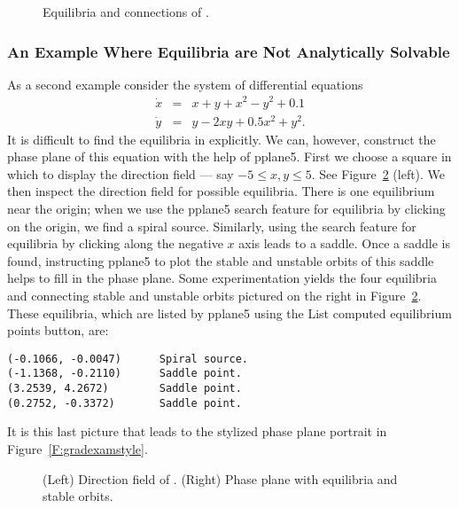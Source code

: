 \documentclass{ximera}
\begin{document}
\begin{figure}[htb]
           \centerline{%
           }
		\caption{Equilibria and connections of \protect{}.} 
           \label{F:ex12}
\end{figure}

\subsubsection*{An Example Where Equilibria are Not Analytically Solvable}

As a second example consider the system of differential
equations
\begin{equation*} \label{e:gradexam}
\begin{array}{rcl}
\dot{x} & = & x + y + x^2 - y^2 + 0.1 \\
\dot{y} & = & y - 2xy + 0.5x^2 + y^2.
\end{array}
\end{equation*}
It is difficult to find the equilibria in  explicitly.
We can, however, construct the phase plane of this equation with the 
help of {\sf pplane5}.  First we choose a square in which to display 
the direction field --- say $-5\leq x,y \leq 5$. See 
Figure~\ref{F:gradexam} (left).  We then inspect the direction field 
for possible equilibria.  There is one equilibrium near the origin;  
when we use the {\sf pplane5} search feature for equilibria by clicking 
on the origin, we find a spiral source. Similarly, using the search feature 
for equilibria by clicking along the negative $x$ axis leads to a saddle.  
Once a saddle is found, instructing {\sf pplane5} to plot the stable and 
unstable orbits of this saddle helps to fill in the phase plane.  
Some experimentation yields the four equilibria and connecting stable 
and unstable orbits pictured on the right in Figure~\ref{F:gradexam}.
These equilibria, which are listed by {\sf pplane5} using the {\sf List
computed equilibrium points} button, are:
\begin{verbatim}  
(-0.1066, -0.0047)      Spiral source.           
(-1.1368, -0.2110)      Saddle point.            
(3.2539, 4.2672)        Saddle point.            
(0.2752, -0.3372)       Saddle point.       
\end{verbatim}
It is this last picture that leads to the stylized phase plane portrait 
in Figure~\ref{F:gradexamstyle}. 

\begin{figure}[htb]
           \centerline{%
           }
           \caption{(Left) Direction field of \protect{}.
	(Right) Phase plane with equilibria and stable orbits.}
           \label{F:gradexam}
\end{figure}
\end{document}
